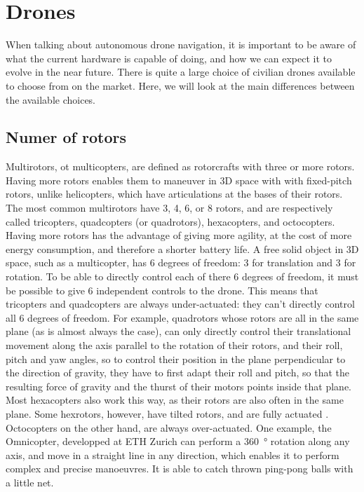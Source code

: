 \section{Drones}
When talking about autonomous drone navigation, it is important to be aware of what the current hardware is capable of doing, and how we can expect it to evolve in the near future. There is quite a large choice of civilian drones available to choose from on the market. Here, we will look at the main differences between the available choices.

\subsection{Numer of rotors}
Multirotors, ot multicopters, are defined as rotorcrafts with three or more rotors. Having more rotors enables them to maneuver in 3D space with with fixed-pitch rotors, unlike helicopters, which have articulations at the bases of their rotors. The most common multirotors have 3, 4, 6, or 8 rotors, and are respectively called tricopters, quadcopters (or quadrotors), hexacopters, and octocopters. Having more rotors has the advantage of giving more agility, at the cost of more energy consumption, and therefore a shorter battery life. A free solid object in 3D space, such as a multicopter, has 6 degrees of freedom: 3 for translation and 3 for rotation. To be able to directly control each of there 6 degrees of freedom, it must be possible to give 6 independent controls to the drone. This means that tricopters and quadcopters are always under-actuated: they can't directly control all 6 degrees of freedom.
For example, quadrotors whose rotors are all in the same plane (as is almost always the case), can only directly control their translational movement along the axis parallel to the rotation of their rotors, and their roll, pitch and yaw angles, so to control their position in the plane perpendicular to the direction of gravity, they have to first adapt their roll and pitch, so that the resulting force of gravity and the thurst of their motors points inside that plane. Most hexacopters also work this way, as their rotors are also often in the same plane. Some hexrotors, however, have tilted rotors, and are fully actuated  \cite{dexteroushexrotor}. \\
Octocopters on the other hand, are always over-actuated. One example, the Omnicopter, developped at ETH Zurich \cite{omnidirectionalav} can perform a \SI{360}{\degree} rotation along any axis, and move in a straight line in any direction, which enables it to perform complex and precise manoeuvres. It is able to catch thrown ping-pong balls with a little net.

